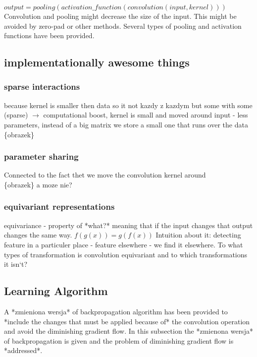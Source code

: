\documentclass[a4paper,10pt]{report}
\begin{document}
	  $output = pooling(activation\_function(convolution(input, kernel)))$\\ %
	  
	  Convolution and pooling might decrease the size of the input. This might be avoided by zero-pad or other methods. Several types of pooling and activation functions have been provided.\\ %
	  
      \subsection{implementationally awesome things} %
	
	\subsubsection{sparse interactions} %
	  because kernel is smaller then data so it not kazdy z kazdym but some with some (sparse) $\rightarrow$ computational boost, kernel is small and moved around input - less parameters, instead of a big matrix we store a small one that runs over the data\\
	  
	  \{obrazek\} %
	  
	\subsubsection{parameter sharing} %
	  Connected to the fact thet we move the convolution kernel around \\
	  
	  \{obrazek\} a moze nie?
	  
	\subsubsection{equivariant representations} %
	  equivariance - property of *what?* meaning that if the input changes that output changes the same way. $f(g(x)) = g(f(x))$ Intuition about it: detecting feature in a particuler place - feature elsewhere - we find it elsewhere. To what types of transformation is convolution equivariant and to which transformations it isn`t?
      
      \subsection{Learning Algorithm} %
	A *zmieniona wersja* of backpropagation algorithm has been provided to *include the changes that must be applied because of* the convolution operation and avoid the diminishing gradient flow. In this subsection the *zmienona wersja* of backpropagation is given and the problem of diminishing gradient flow is *addressed*.
	
\end{document}
